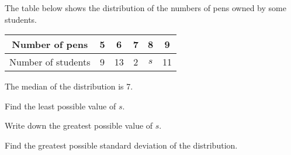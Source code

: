 
The table below shows the distribution of the numbers of pens owned by some students.
\begin{center}
\begin{tabular}{|c|c|c|c|c|c|}
    \hline
    Number of pens & 5 & 6 & 7 & 8 & 9 \\
    \hline
    Number of students & 9 & 13 & 2 & $s$ & 11 \\
    \hline
\end{tabular}
\end{center}
The median of the distribution is 7.


\begin{enumx}[label=(\alph*)]
    \item Find the least possible value of $s$.
    \item Write down the greatest possible value of $s$.
    \item Find the greatest possible standard deviation of the distribution.
\end{enumx}




